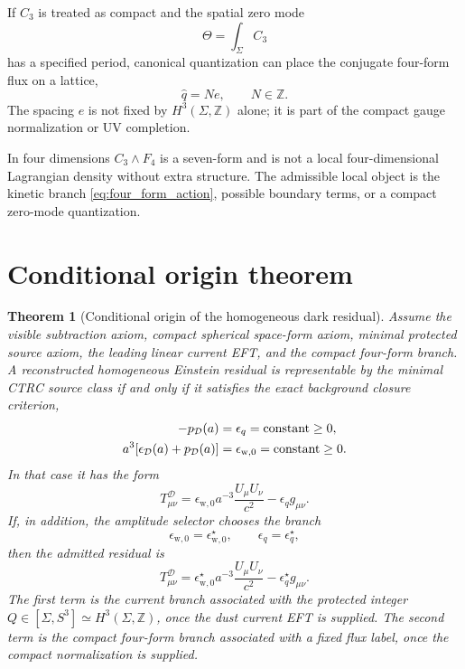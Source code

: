 \documentclass[
  aps,
  prd,
  reprint,
  superscriptaddress,
  floatfix,
  nofootinbib,
  longbibliography
]{revtex4-2}
\theoremstyle{plain}
\newtheorem{theorem}{Theorem}
\theoremstyle{definition}
\theoremstyle{remark}
\newcommand{\D}{\mathcal D}
\newcommand{\w}{\mathrm w}
\newcommand{\Z}{\mathbb Z}
\newcommand{\eps}{\epsilon}
\newcommand{\qhat}{\widehat q}
\begin{document}
If \(C_3\) is treated as compact and the spatial zero mode
\begin{equation}
\Theta=\int_{\Sigma}C_3
\label{eq:theta_zero_mode}
\end{equation}
has a specified period, canonical quantization can place the conjugate four-form flux on a lattice,
\begin{equation}
\qhat=N e,\qquad N\in\Z .
\label{eq:flux_lattice}
\end{equation}
The spacing \(e\) is not fixed by \(H^3(\Sigma,\Z)\) alone; it is part of the compact gauge normalization or UV completion.

In four dimensions \(C_3\wedge F_4\) is a seven-form and is not a local four-dimensional Lagrangian density without extra structure.  The admissible local object is the kinetic branch \eqref{eq:four_form_action}, possible boundary terms, or a compact zero-mode quantization.

\section{Conditional origin theorem}

\begin{theorem}[Conditional origin of the homogeneous dark residual]
Assume the visible subtraction axiom, compact spherical space-form axiom,
minimal protected source axiom, the leading linear current EFT, and the compact
four-form branch.  A reconstructed homogeneous Einstein residual is representable
by the minimal CTRC source class if and only if it satisfies the exact
background closure criterion,
\begin{equation}
\begin{aligned}
-p_\D(a)&=\eps_q=\hbox{constant}\ge0,\\
a^3[\eps_\D(a)+p_\D(a)]&=\eps_{\w,0}=\hbox{constant}\ge0 .
\end{aligned}
\label{eq:conditional_origin_closure}
\end{equation}
In that case it has the form
\begin{equation}
T^\D_{\mu\nu}
=
\eps_{\w,0}a^{-3}\frac{U_\mu U_\nu}{c^2}
-\eps_q g_{\mu\nu}.
\label{eq:conditional_origin_tensor}
\end{equation}
If, in addition, the amplitude selector chooses the branch
\begin{equation}
\eps_{\w,0}=\eps_{\w,0}^{\star},
\qquad
\eps_q=\eps_q^{\star},
\label{eq:selected_branch_values}
\end{equation}
then the admitted residual is
\begin{equation}
T^\D_{\mu\nu}
=
\eps_{\w,0}^{\star}a^{-3}\frac{U_\mu U_\nu}{c^2}
-\eps_q^{\star}g_{\mu\nu}.
\label{eq:selected_branch_tensor}
\end{equation}
The first term is the current branch associated with the protected integer
\(Q\in[\Sigma,S^3]\simeq H^3(\Sigma,\Z)\), once the dust current EFT is supplied.
The second term is the compact four-form branch associated with a fixed flux
label, once the compact normalization is supplied.
\end{theorem}
\end{document}

